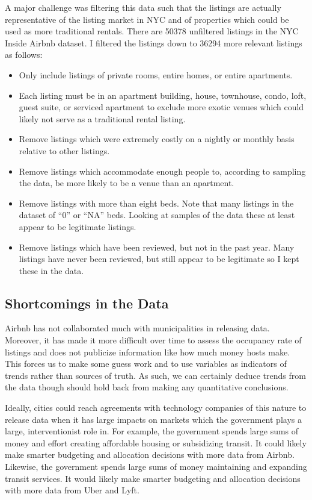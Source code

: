 \documentclass[12pt]{article}
\begin{document}
A major challenge was filtering this data such that the listings are actually representative of the listing market in NYC and of properties which could be used as more traditional rentals. There are 50378 unfiltered listings in the NYC Inside Airbnb dataset. I filtered the listings down to 36294 more relevant listings as follows:

\begin{itemize}
  \item Only include listings of private rooms, entire homes, or entire apartments.
  \item Each listing must be in an apartment building, house, townhouse, condo, loft, guest suite, or serviced apartment to exclude more exotic venues which could likely not serve as a traditional rental listing.
  \item Remove listings which were extremely costly on a nightly or monthly basis relative to other listings.
  \item Remove listings which accommodate enough people to, according to sampling the data, be more likely to be a venue than an apartment.
  \item Remove listings with more than eight beds. Note that many listings in the dataset of ``0'' or ``NA'' beds. Looking at samples of the data these at least appear to be legitimate listings.
  \item Remove listings which have been reviewed, but not in the past year. Many listings have never been reviewed, but still appear to be legitimate so I kept these in the data.
\end{itemize}

\subsection{Shortcomings in the Data}

Airbnb has not collaborated much with municipalities in releasing data. Moreover, it has made it more difficult over time to assess the occupancy rate of listings and does not publicize information like how much money hosts make. This forces us to make some guess work and to use variables as indicators of trends rather than sources of truth. As such, we can certainly deduce trends from the data though should hold back from making any quantitative conclusions.

Ideally, cities could reach agreements with technology companies of this nature to release data when it has large impacts on markets which the government plays a large, interventionist role in. For example, the government spends large sums of money and effort creating affordable housing or subsidizing transit. It could likely make smarter budgeting and allocation decisions with more data from Airbnb. Likewise, the government spends large sums of money maintaining and expanding transit services. It would likely make smarter budgeting and allocation decisions with more data from Uber and Lyft.
\end{document}
